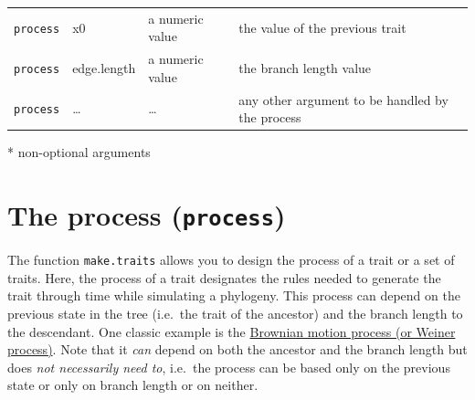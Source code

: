 \documentclass[
]{book}
\begin{document}
\begin{longtable}[]{@{}llll@{}}
\begin{minipage}[t]{0.19\columnwidth}
\texttt{process}\strut
\end{minipage} & \begin{minipage}[t]{0.23\columnwidth}\raggedright
x0\strut
\end{minipage} & \begin{minipage}[t]{0.14\columnwidth}\raggedright
a numeric value\strut
\end{minipage} & \begin{minipage}[t]{0.33\columnwidth}\raggedright
the value of the previous trait\strut
\end{minipage}\tabularnewline
\begin{minipage}[t]{0.19\columnwidth}\raggedright
\texttt{process}\strut
\end{minipage} & \begin{minipage}[t]{0.23\columnwidth}\raggedright
edge.length\strut
\end{minipage} & \begin{minipage}[t]{0.14\columnwidth}\raggedright
a numeric value\strut
\end{minipage} & \begin{minipage}[t]{0.33\columnwidth}\raggedright
the branch length value\strut
\end{minipage}\tabularnewline
\begin{minipage}[t]{0.19\columnwidth}\raggedright
\texttt{process}\strut
\end{minipage} & \begin{minipage}[t]{0.23\columnwidth}\raggedright
\ldots{}\strut
\end{minipage} & \begin{minipage}[t]{0.14\columnwidth}\raggedright
\ldots{}\strut
\end{minipage} & \begin{minipage}[t]{0.33\columnwidth}\raggedright
any other argument to be handled by the process\strut
\end{minipage}\tabularnewline
\bottomrule
\end{longtable}

* non-optional arguments

\hypertarget{the-process-process}{%
\section{\texorpdfstring{The process (\texttt{process})}{The process (process)}}\label{the-process-process}}

The function \texttt{make.traits} allows you to design the process of a trait or a set of traits.
Here, the process of a trait designates the rules needed to generate the trait through time while simulating a phylogeny.
This process can depend on the previous state in the tree (i.e.~the trait of the ancestor) and the branch length to the descendant.
One classic example is the \href{https://en.wikipedia.org/wiki/Brownian_motion}{Brownian motion process (or Weiner process)}.
Note that it \emph{can} depend on both the ancestor and the branch length but does \emph{not necessarily need to}, i.e.~the process can be based only on the previous state or only on branch length or on neither.
\end{document}
